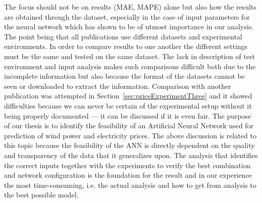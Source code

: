 The focus should not be on results (MAE, MAPE) alone but also how the results are obtained through the dataset, especially in the case of input parameters for the neural network which has shown to be of utmost importance in our analysis. The point being that all publications use different datasets and experimental environments. In order to compare results to one another the different settings must be the same and tested on the same dataset. The lack in description of test environment and input analysis makes such comparisons difficult both due to the incomplete information but also because the format of the datasets cannot be seen or downloaded to extract the information. Comparison with another publication was attempted in Section~\ref{sec:priceExperimentThree} and it showed difficulties because we can never be certain of the experimental setup without it being properly documented --- it can be discussed if it is even fair. The purpose of our thesis is to identify the feasibility of an Artificial Neural Network used for prediction of wind power and electricity prices. The above discussion is related to this topic because the feasibility of the ANN is directly dependent on the quality and transparency of the data that it generalizes upon. The analysis that identifies the correct inputs together with the experiments to verify the best combination and network configuration is the foundation for the result and in our experience the most time-consuming, i.e. the actual analysis and how to get from analysis to the best possible model. 

